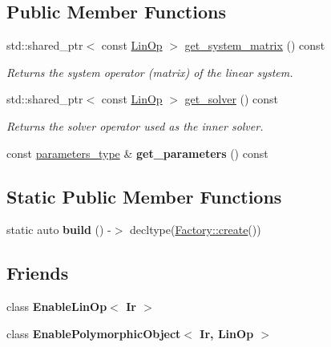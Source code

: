 \subsection*{Public Member Functions}
\begin{DoxyCompactItemize}
\item 
std\+::shared\+\_\+ptr$<$ const \hyperlink{classgko_1_1LinOp}{Lin\+Op} $>$ \hyperlink{classgko_1_1solver_1_1Ir_a2095b57bb8d3c31e0cfe395c911dbf84}{get\+\_\+system\+\_\+matrix} () const
\begin{DoxyCompactList}\small\item\em Returns the system operator (matrix) of the linear system. \end{DoxyCompactList}\item 
std\+::shared\+\_\+ptr$<$ const \hyperlink{classgko_1_1LinOp}{Lin\+Op} $>$ \hyperlink{classgko_1_1solver_1_1Ir_a3996838d5c38740a9777b522317ce3f1}{get\+\_\+solver} () const
\begin{DoxyCompactList}\small\item\em Returns the solver operator used as the inner solver. \end{DoxyCompactList}\item 
\mbox{\label{classgko_1_1solver_1_1Ir_a3bfeb9b57cea666c5fef55c10b27d897}} 
const \hyperlink{structgko_1_1solver_1_1Ir_1_1parameters__type}{parameters\+\_\+type} \& {\bfseries get\+\_\+parameters} () const
\end{DoxyCompactItemize}
\subsection*{Static Public Member Functions}
\begin{DoxyCompactItemize}
\item 
\mbox{\label{classgko_1_1solver_1_1Ir_a3d166fb4dd818591885710481337ae19}} 
static auto {\bfseries build} () -\/$>$ decltype(\hyperlink{classgko_1_1EnableDefaultFactory_a1d077101d9e788e6c65f088612d14cc3}{Factory\+::create}())
\end{DoxyCompactItemize}
\subsection*{Friends}
\begin{DoxyCompactItemize}
\item 
\mbox{\label{classgko_1_1solver_1_1Ir_ac093132f180b389cafe5a3694d819dbd}} 
class {\bfseries Enable\+Lin\+Op$<$ Ir $>$}
\item 
\mbox{\label{classgko_1_1solver_1_1Ir_a775344ad65e9b035bfe6b4bb2cf99ce3}} 
class {\bfseries Enable\+Polymorphic\+Object$<$ Ir, Lin\+Op $>$}
\end{DoxyCompactItemize}


